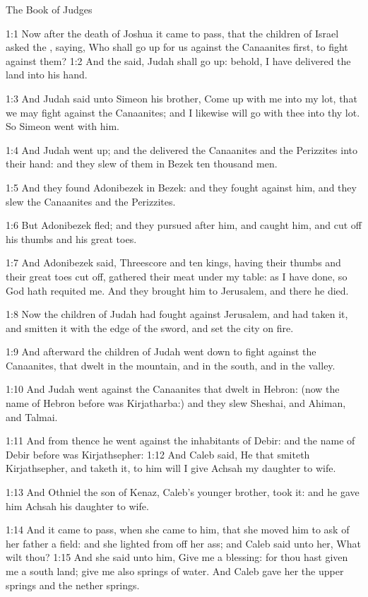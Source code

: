 The Book of Judges


1:1 Now after the death of Joshua it came to pass, that the children
of Israel asked the \LORD, saying, Who shall go up for us against the
Canaanites first, to fight against them?  1:2 And the \LORD said, Judah
shall go up: behold, I have delivered the land into his hand.

1:3 And Judah said unto Simeon his brother, Come up with me into my
lot, that we may fight against the Canaanites; and I likewise will go
with thee into thy lot. So Simeon went with him.

1:4 And Judah went up; and the \LORD delivered the Canaanites and the
Perizzites into their hand: and they slew of them in Bezek ten
thousand men.

1:5 And they found Adonibezek in Bezek: and they fought against him,
and they slew the Canaanites and the Perizzites.

1:6 But Adonibezek fled; and they pursued after him, and caught him,
and cut off his thumbs and his great toes.

1:7 And Adonibezek said, Threescore and ten kings, having their thumbs
and their great toes cut off, gathered their meat under my table: as I
have done, so God hath requited me. And they brought him to Jerusalem,
and there he died.

1:8 Now the children of Judah had fought against Jerusalem, and had
taken it, and smitten it with the edge of the sword, and set the city
on fire.

1:9 And afterward the children of Judah went down to fight against the
Canaanites, that dwelt in the mountain, and in the south, and in the
valley.

1:10 And Judah went against the Canaanites that dwelt in Hebron: (now
the name of Hebron before was Kirjatharba:) and they slew Sheshai, and
Ahiman, and Talmai.

1:11 And from thence he went against the inhabitants of Debir: and the
name of Debir before was Kirjathsepher: 1:12 And Caleb said, He that
smiteth Kirjathsepher, and taketh it, to him will I give Achsah my
daughter to wife.

1:13 And Othniel the son of Kenaz, Caleb's younger brother, took it:
and he gave him Achsah his daughter to wife.

1:14 And it came to pass, when she came to him, that she moved him to
ask of her father a field: and she lighted from off her ass; and Caleb
said unto her, What wilt thou?  1:15 And she said unto him, Give me a
blessing: for thou hast given me a south land; give me also springs of
water. And Caleb gave her the upper springs and the nether springs.

